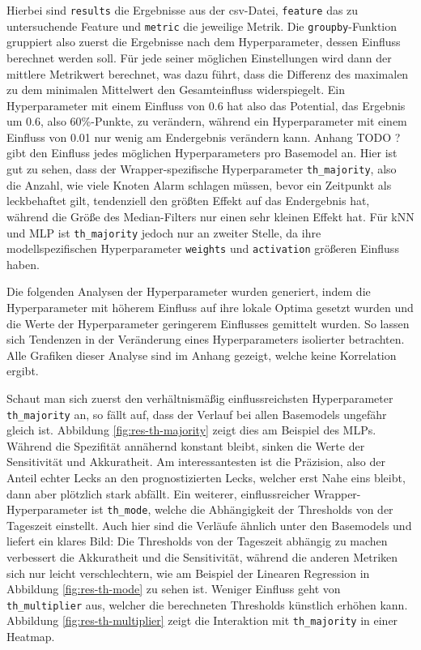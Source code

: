 Hierbei sind \texttt{results} die Ergebnisse aus der csv-Datei, \texttt{feature} das zu untersuchende Feature
 und \texttt{metric} die jeweilige Metrik. Die \texttt{groupby}-Funktion gruppiert also zuerst die Ergebnisse
 nach dem Hyperparameter, dessen Einfluss berechnet werden soll. Für jede seiner möglichen Einstellungen wird
 dann der mittlere Metrikwert berechnet, was dazu führt, dass die Differenz des maximalen zu dem minimalen
 Mittelwert den Gesamteinfluss widerspiegelt. Ein Hyperparameter mit einem Einfluss von 0.6 hat also das
 Potential, das Ergebnis um 0.6, also 60\%-Punkte, zu verändern, während ein Hyperparameter mit einem Einfluss
 von 0.01 nur wenig am Endergebnis verändern kann. Anhang TODO ? gibt den Einfluss jedes möglichen Hyperparameters
 pro Basemodel an. Hier ist gut zu sehen, dass der Wrapper-spezifische Hyperparameter \texttt{th\_majority},
 also die Anzahl, wie viele Knoten Alarm schlagen müssen, bevor ein Zeitpunkt als leckbehaftet gilt, tendenziell
 den größten Effekt auf das Endergebnis hat, während die Größe des Median-Filters nur einen sehr kleinen Effekt
 hat. Für kNN und MLP ist \texttt{th\_majority} jedoch nur an zweiter Stelle, da ihre modellspezifischen
 Hyperparameter \texttt{weights} und \texttt{activation} größeren Einfluss haben.

Die folgenden Analysen der Hyperparameter wurden generiert, indem die Hyperparameter mit höherem Einfluss auf
 ihre lokale Optima gesetzt wurden und die Werte der Hyperparameter geringerem Einflusses gemittelt wurden.
 So lassen sich Tendenzen in der Veränderung eines Hyperparameters isolierter betrachten. Alle Grafiken dieser
 Analyse sind im Anhang gezeigt, welche keine Korrelation ergibt.

Schaut man sich zuerst den verhältnismäßig einflussreichsten Hyperparameter \texttt{th\_majority} an, so fällt auf,
 dass der Verlauf bei allen Basemodels ungefähr gleich ist. Abbildung \ref{fig:res-th-majority} zeigt dies am
 Beispiel des MLPs. Während die Spezifität annähernd konstant bleibt, sinken die Werte der Sensitivität und
 Akkuratheit. Am interessantesten ist die Präzision, also der Anteil echter Lecks an den prognostizierten Lecks,
 welcher erst Nahe eins bleibt, dann aber plötzlich stark abfällt. Ein weiterer, einflussreicher
 Wrapper-Hyperparameter ist \texttt{th\_mode}, welche die Abhängigkeit der Thresholds von der Tageszeit einstellt.
 Auch hier sind die Verläufe ähnlich unter den Basemodels und liefert ein klares Bild: Die Thresholds von der
 Tageszeit abhängig zu machen verbessert die Akkuratheit und die Sensitivität, während die anderen Metriken sich
 nur leicht verschlechtern, wie am Beispiel der Linearen Regression in Abbildung \ref{fig:res-th-mode} zu sehen
 ist. Weniger Einfluss geht von \texttt{th\_multiplier} aus, welcher die berechneten Thresholds künstlich erhöhen
 kann. Abbildung \ref{fig:res-th-multiplier} zeigt die Interaktion mit \texttt{th\_majority} in einer Heatmap.

